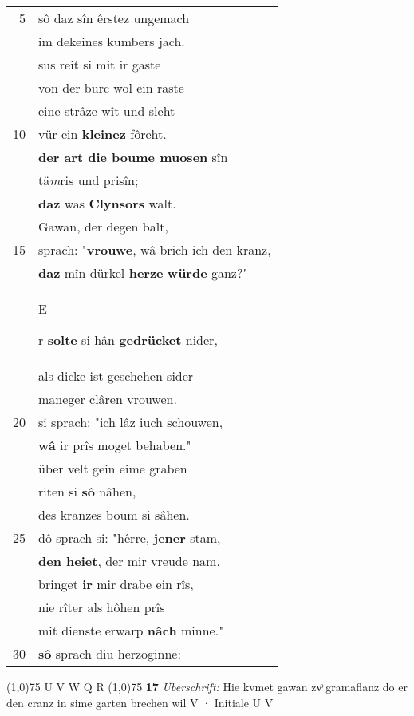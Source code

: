 \documentclass[8pt,a4paper,notitlepage]{article}
\begin{document}
\begin{table}[ht]
\begin{minipage}[t]{0.5\linewidth}
\begin{tabular}{rl}
5 & sô daz sîn êrstez ungemach\\ 
 & im dekeines kumbers jach.\\ 
 & sus reit si mit ir gaste\\ 
 & von der burc wol ein raste\\ 
 & eine strâze wît und sleht\\ 
10 & vür ein \textbf{kleinez} fôreht.\\ 
 & \textbf{der art die boume muosen} sîn\\ 
 & tä\textit{m}ris und prisîn;\\ 
 & \textbf{daz} was \textbf{Clynsors} walt.\\ 
 & Gawan, der degen balt,\\ 
15 & sprach: "\textbf{vrouwe}, wâ brich ich den kranz,\\ 
 & \textbf{daz} mîn dürkel \textbf{herze} \textbf{würde} ganz?"\\ 
 & \begin{large}E\end{large}r \textbf{solte} si hân \textbf{gedrücket} nider,\\ 
 & als dicke ist geschehen sider\\ 
 & maneger clâren vrouwen.\\ 
20 & si sprach: "ich lâz iuch schouwen,\\ 
 & \textbf{wâ} ir prîs moget behaben."\\ 
 & über velt gein eime graben\\ 
 & riten si \textbf{sô} nâhen,\\ 
 & des kranzes boum si sâhen.\\ 
25 & dô sprach si: "hêrre, \textbf{jener} stam,\\ 
 & \textbf{den heiet}, der mir vreude nam.\\ 
 & bringet \textbf{ir} mir drabe ein rîs,\\ 
 & nie rîter als hôhen prîs\\ 
 & mit dienste erwarp \textbf{nâch} minne."\\ 
30 & \textbf{sô} sprach diu herzoginne:\\ 
\end{tabular}
\scriptsize
\line(1,0){75} \newline
U V W Q R \newline
\line(1,0){75} \newline
\textbf{17} \textit{Überschrift:} Hie kvmet gawan zvͦ gramaflanz do er den cranz in sime garten brechen wil V  · Initiale U V  \newline

\end{minipage}
\end{table}
\end{document}
